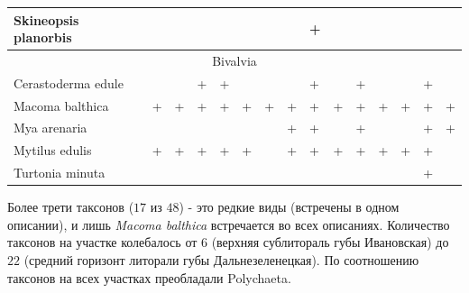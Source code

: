 \begin{footnotesize}
\begin{longtable}{|p{2cm}|p{0.4cm}p{0.4cm}|p{0.4cm}p{0.4cm}|p{0.4cm}p{0.4cm}|p{0.35cm}p{0.35cm}p{0.35cm}|p{1cm}|p{0.5cm}p{0.5cm}|p{1cm}|p{1cm}|}
Skineopsis planorbis      &           &           &           &           &           &           &          & +        &          &                 &          &          &          &            \\ \hline
\multicolumn{15}{|c|}{Bivalvia} \\ \hline
Cerastoderma edule        &           &           & +         & +         &           &           &          & +        &          & +               &          &          & +        &            \\  \hline
Macoma balthica           & +         & +         & +         & +         & +         & +         & +        & +        & +        & +               & +        & +        & +        & +          \\  \hline
Mya arenaria              &           &           &           &           &           &           & +        & +        &          & +               &          &          & +        & +          \\  \hline
Mytilus edulis            & +         & +         & +         & +         & +         &           & +        & +        & +        & +               & +        & +        & +        &            \\  \hline
Turtonia minuta           &           &           &           &           &           &           &          &          &          &                 &          &          & +        &           \\ \hline

\end{longtable}
\end{footnotesize}
Более трети таксонов ($17$ из $48$) - это редкие виды (встречены в одном описании), и лишь {\it Macoma balthica} встречается во всех описаниях. 
Количество таксонов на участке колебалось от $6$ (верхняя сублитораль губы Ивановская) до $22$ (средний горизонт литорали губы Дальнезеленецкая). 
По соотношению таксонов на всех участках преобладали Polychaeta.
	

